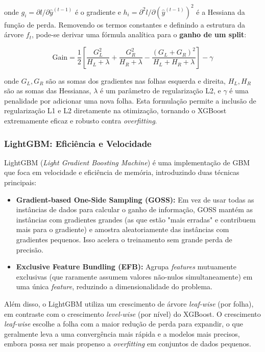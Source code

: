 \documentclass[12pt, a4paper, oneside]{report}
\begin{document}
onde $g_i = \partial l / \partial \hat{y}^{(t-1)}$ é o gradiente e $h_i = \partial^2 l / \partial (\hat{y}^{(t-1)})^2$ é a Hessiana da função de perda. Removendo os termos constantes e definindo a estrutura da árvore $f_t$, pode-se derivar uma fórmula analítica para o \textbf{ganho de um split}:

\begin{equation}
    \text{Gain} = \frac{1}{2} \left[ \frac{G_L^2}{H_L + \lambda} + \frac{G_R^2}{H_R + \lambda} - \frac{(G_L+G_R)^2}{H_L+H_R+\lambda} \right] - \gamma
\end{equation}

onde $G_L, G_R$ são as somas dos gradientes nas folhas esquerda e direita, $H_L, H_R$ são as somas das Hessianas, $\lambda$ é um parâmetro de regularização L2, e $\gamma$ é uma penalidade por adicionar uma nova folha. Esta formulação permite a inclusão de regularização L1 e L2 diretamente na otimização, tornando o XGBoost extremamente eficaz e robusto contra \textit{overfitting}.

\subsubsection{LightGBM: Eficiência e Velocidade}

LightGBM (\textit{Light Gradient Boosting Machine}) \cite{ke2017} é uma implementação de GBM que foca em velocidade e eficiência de memória, introduzindo duas técnicas principais:

\begin{itemize}
    \item \textbf{Gradient-based One-Side Sampling (GOSS):} Em vez de usar todas as instâncias de dados para calcular o ganho de informação, GOSS mantém as instâncias com gradientes grandes (as que estão "mais erradas" e contribuem mais para o gradiente) e amostra aleatoriamente das instâncias com gradientes pequenos. Isso acelera o treinamento sem grande perda de precisão.
    \item \textbf{Exclusive Feature Bundling (EFB):} Agrupa \textit{features} mutuamente exclusivas (que raramente assumem valores não-nulos simultaneamente) em uma única \textit{feature}, reduzindo a dimensionalidade do problema.
\end{itemize}

Além disso, o LightGBM utiliza um crescimento de árvore \textit{leaf-wise} (por folha), em contraste com o crescimento \textit{level-wise} (por nível) do XGBoost. O crescimento \textit{leaf-wise} escolhe a folha com a maior redução de perda para expandir, o que geralmente leva a uma convergência mais rápida e a modelos mais precisos, embora possa ser mais propenso a \textit{overfitting} em conjuntos de dados pequenos.
\end{document}
